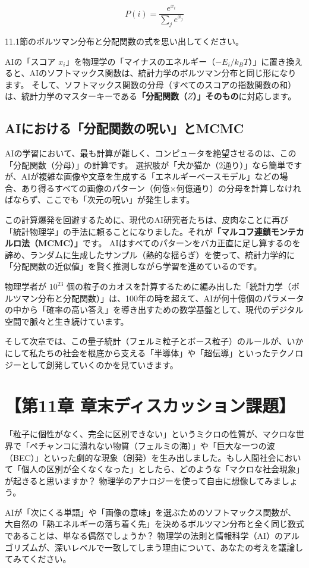 \[
P(i) = \frac{e^{x_i}}{\sum_j e^{x_j}}
\]

11.1節のボルツマン分布と分配関数の式を思い出してください。

AIの「スコア \(x_i\)」を物理学の「マイナスのエネルギー（\(-E_i/k_B T\)）」に置き換えると、AIのソフトマックス関数は、統計力学のボルツマン分布と同じ形になります。 そして、ソフトマックス関数の分母（すべてのスコアの指数関数の和）は、統計力学のマスターキーである\textbf{「分配関数（\(Z\)）」そのもの}に対応します。

\subsection{AIにおける「分配関数の呪い」とMCMC}

AIの学習において、最も計算が難しく、コンピュータを絶望させるのは、この「分配関数（分母）」の計算です。 選択肢が「犬か猫か（2通り）」なら簡単ですが、AIが複雑な画像や文章を生成する「エネルギーベースモデル」などの場合、あり得るすべての画像のパターン（何億×何億通り）の分母を計算しなければならず、ここでも「次元の呪い」が発生します。

この計算爆発を回避するために、現代のAI研究者たちは、皮肉なことに再び「統計物理学」の手法に頼ることになりました。それが\textbf{「マルコフ連鎖モンテカルロ法（MCMC）」}です。 AIはすべてのパターンをバカ正直に足し算するのを諦め、ランダムに生成したサンプル（熱的な揺らぎ）を使って、統計力学的に「分配関数の近似値」を賢く推測しながら学習を進めているのです。

物理学者が \ensuremath{10^{23}} 個の粒子のカオスを計算するために編み出した「統計力学（ボルツマン分布と分配関数）」は、100年の時を超えて、AIが何十億個のパラメータの中から「確率の高い答え」を導き出すための数学基盤として、現代のデジタル空間で脈々と生き続けています。

そして次章では、この量子統計（フェルミ粒子とボース粒子）のルールが、いかにして私たちの社会を根底から支える「半導体」や「超伝導」といったテクノロジーとして創発していくのかを見ていきます。

\section*{【第11章 章末ディスカッション課題】}

「粒子に個性がなく、完全に区別できない」というミクロの性質が、マクロな世界で「ペチャンコに潰れない物質（フェルミの海）」や「巨大な一つの波（BEC）」といった劇的な現象（創発）を生み出しました。もし人間社会において「個人の区別が全くなくなった」としたら、どのような「マクロな社会現象」が起きると思いますか？ 物理学のアナロジーを使って自由に想像してみましょう。

AIが「次にくる単語」や「画像の意味」を選ぶためのソフトマックス関数が、大自然の「熱エネルギーの落ち着く先」を決めるボルツマン分布と全く同じ数式であることは、単なる偶然でしょうか？ 物理学の法則と情報科学（AI）のアルゴリズムが、深いレベルで一致してしまう理由について、あなたの考えを議論してみてください。




